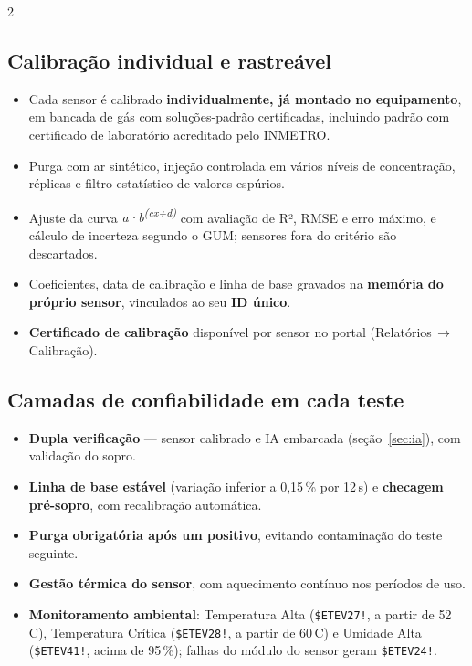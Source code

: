 \documentclass[a4paper,10pt]{article}
\newcommand{\ev}[1]{\texttt{\$ETEV#1!}}
\newcommand{\seta}{\,$\rightarrow$\,}
\begin{document}
\begin{multicols}{2}
\subsection{Calibração individual e rastreável}
\begin{itemize}
  \item Cada sensor é calibrado \textbf{individualmente, já montado no equipamento}, em bancada de gás com soluções-padrão certificadas, incluindo padrão com certificado de laboratório acreditado pelo INMETRO.
  \item Purga com ar sintético, injeção controlada em vários níveis de concentração, réplicas e filtro estatístico de valores espúrios.
  \item Ajuste da curva \emph{a·b\textsuperscript{(cx+d)}} com avaliação de R², RMSE e erro máximo, e cálculo de incerteza segundo o GUM; sensores fora do critério são descartados.
  \item Coeficientes, data de calibração e linha de base gravados na \textbf{memória do próprio sensor}, vinculados ao seu \textbf{ID único}.
  \item \textbf{Certificado de calibração} disponível por sensor no portal (Relatórios\seta Calibração).
\end{itemize}

\subsection{Camadas de confiabilidade em cada teste}
\begin{itemize}
  \item \textbf{Dupla verificação} — sensor calibrado e IA embarcada (seção~\ref{sec:ia}), com validação do sopro.
  \item \textbf{Linha de base estável} (variação inferior a 0,15\,\% por 12\,s) e \textbf{checagem pré-sopro}, com recalibração automática.
  \item \textbf{Purga obrigatória após um positivo}, evitando contaminação do teste seguinte.
  \item \textbf{Gestão térmica do sensor}, com aquecimento contínuo nos períodos de uso.
  \item \textbf{Monitoramento ambiental}: Temperatura Alta (\ev{27}, a partir de 52\,\textdegree C), Temperatura Crítica (\ev{28}, a partir de 60\,\textdegree C) e Umidade Alta (\ev{41}, acima de 95\,\%); falhas do módulo do sensor geram \ev{24}.
\end{itemize}


\end{multicols}
\end{document}
